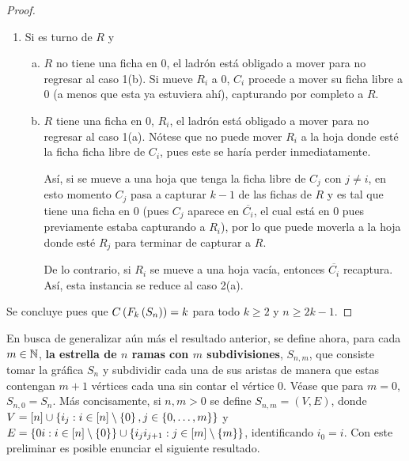 \begin{proof}
\begin{enumerate}
        \item Si es turno de $R$ y
        \begin{enumerate}[(a)]
            \item $R$ no tiene una ficha en $0$, el ladr\'on est\'a obligado a
            mover para no regresar al caso 1(b). Si mueve $R_i$ a $0$, $C_i$
            procede a mover su ficha libre a $0$ (a menos que esta ya estuviera
            ah\'i), capturando por completo a $R$.
            
            \item $R$ tiene una ficha en $0$, $R_i$, el ladr\'on est\'a obligado
            a mover para no regresar al caso 1(a). N\'otese que no puede mover
            $R_i$ a la hoja donde est\'e la ficha ficha libre de $C_i$, pues
            este se har\'ia perder inmediatamente.
            
            As\'i, si se mueve a una hoja que tenga la ficha libre de $C_j$ con
            $j\neq i$, en esto momento $C_j$ pasa a capturar $k-1$ de las fichas
            de $R$ y es tal que tiene una ficha en $0$ (pues $C_j$ aparece en
            $\overline{C_i}$, el cual est\'a en $0$ pues previamente estaba
            capturando a $R_i$), por lo que puede moverla a la hoja donde est\'e
            $R_j$ para terminar de capturar a $R$.

            De lo contrario, si $R_i$ se mueve a una hoja vac\'ia, entonces
            $\overline{C_i}$ recaptura. As\'i, esta instancia se reduce al caso
            2(a).
        \end{enumerate}
    \end{enumerate}
    Se concluye pues que $C\left( F_k\left( S_n\right)\right)=k$ para todo $k\geq 2$ y $n\geq 2k-1$.
    
    
\end{proof}

En busca de generalizar a\'un m\'as el resultado anterior, se define ahora, para
cada $m\in \mathbb{N}$, \textbf{la estrella de $n$ ramas con $m$ subdivisiones},
$S_{n,m}$, que consiste tomar la gr\'afica $S_n$ y subdividir cada una de sus
aristas de manera que estas contengan $m+1$ v\'ertices cada una sin contar el
v\'ertice $0$. V\'ease que para $m=0$, $S_{n,0}=S_n$. M\'as concisamente, si
$n,m > 0$ se define $S_{n,m}=(V,E)$, donde $V=\left[ n\right]\cup\left\{ i_j: i\in
\left[ n\right]\setminus \left\{ 0\right\} , j\in \left\{ 0,\dots, m\right\}\right\}$ y $E=\left\{ 0i : i\in \left[ n\right]\setminus
\left\{ 0\right\}\right\} \cup \left\{ i_ji_{j+1}:j\in\left[ m\right]\setminus\left\{ m\right\}\right\}$, identificando $i_0=i$. Con
este preliminar es posible enunciar el siguiente resultado.

